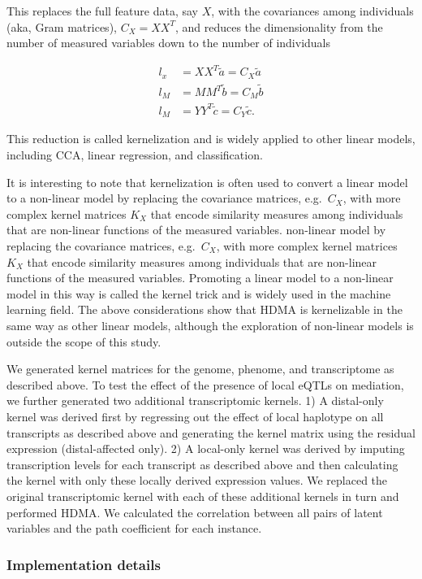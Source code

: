 \documentclass[
]{article}
\begin{document}
This replaces the full feature data, say \(X\), with the covariances
among individuals (aka, Gram matrices), \(C_X = XX^T\), and reduces the
dimensionality from the number of measured variables down to the number
of individuals

\begin{align}
l_x &= XX^T \tilde{a} = C_X \tilde{a} \\
l_M &= MM^T \tilde{b} = C_M \tilde{b} \\
l_M &= YY^T \tilde{c} = C_Y \tilde{c}.
\end{align}

This reduction is called kernelization \cite{tenenhaus2015kernel} and is
widely applied to other linear models, including CCA, linear regression,
and classification.

It is interesting to note that kernelization is often used to convert a
linear model to a non-linear model by replacing the covariance matrices,
e.g.~\(C_X\), with more complex kernel matrices \(K_X\) that encode
similarity measures among individuals that are non-linear functions of
the measured variables. non-linear model by replacing the covariance
matrices, e.g.~\(C_X\), with more complex kernel matrices \(K_X\) that
encode similarity measures among individuals that are non-linear
functions of the measured variables. Promoting a linear model to a
non-linear model in this way is called the kernel trick and is widely
used in the machine learning field. The above considerations show that
HDMA is kernelizable in the same way as other linear models, although
the exploration of non-linear models is outside the scope of this study.

We generated kernel matrices for the genome, phenome, and transcriptome
as described above. To test the effect of the presence of local eQTLs on
mediation, we further generated two additional transcriptomic kernels.
1) A distal-only kernel was derived first by regressing out the effect
of local haplotype on all transcripts as described above and generating
the kernel matrix using the residual expression (distal-affected only).
2) A local-only kernel was derived by imputing transcription levels for
each transcript as described above and then calculating the kernel with
only these locally derived expression values. We replaced the original
transcriptomic kernel with each of these additional kernels in turn and
performed HDMA. We calculated the correlation between all pairs of
latent variables and the path coefficient for each instance.

\subsubsection{Implementation details}\label{implementation-details}
\end{document}
